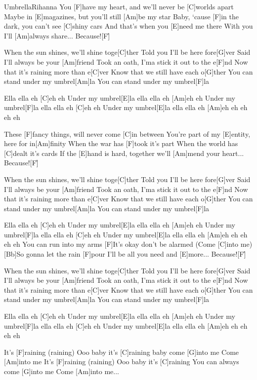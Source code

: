 \documentclass[../main.tex]{subfiles}
\begin{document}
\begin{song}[1]{Umbrella}{Rihanna}{}
You [F]have my heart, and we'll never be [C]worlds apart
Maybe in [E]magazines, but you'll still [Am]be my star
Baby, ‘cause [F]in the dark, you can't see [C]shiny cars
And that's when you [E]need me there
With you I'll [Am]always share... Because![F]{\h}

When the sun shines, we’ll shine toge[C]ther
Told you I'll be here fore[G]ver
Said I'll always be your [Am]friend
Took an oath, I'ma stick it out to the e[F]nd
Now that it's raining more than e[C]ver
Know that we still have each o[G]ther
You can stand under my umbrel[Am]la
You can stand under my umbrel[F]la

Ella ella eh [C]eh eh
Under my umbrel[E]la ella ella eh [Am]eh eh
Under my umbrel[F]la ella ella eh [C]eh eh
Under my umbrel[E]la ella ella eh [Am]eh eh eh eh eh

These [F]fancy things, will never come [C]in between
You're part of my [E]entity, here for in[Am]finity
When the war has [F]took it's part
When the world has [C]dealt it's cards
If the [E]hand is hard, together we'll [Am]mend your heart... Because![F]{\h}

When the sun shines, we’ll shine toge[C]ther
Told you I'll be here fore[G]ver
Said I'll always be your [Am]friend
Took an oath, I'ma stick it out to the e[F]nd
Now that it's raining more than e[C]ver
Know that we still have each o[G]ther
You can stand under my umbrel[Am]la
You can stand under my umbrel[F]la

Ella ella eh [C]eh eh
Under my umbrel[E]la ella ella eh [Am]eh eh
Under my umbrel[F]la ella ella eh [C]eh eh
Under my umbrel[E]la ella ella eh [Am]eh eh eh eh eh
\pagebreak
[Bb]You can run into my arms
[F]It's okay don't be alarmed (Come [C]into me)
[Bb]So gonna let the rain [F]pour
I'll be all you need and [E]more... Because![F]{\h}

When the sun shines, we’ll shine toge[C]ther
Told you I'll be here fore[G]ver
Said I'll always be your [Am]friend
Took an oath, I'ma stick it out to the e[F]nd
Now that it's raining more than e[C]ver
Know that we still have each o[G]ther
You can stand under my umbrel[Am]la
You can stand under my umbrel[F]la

Ella ella eh [C]eh eh
Under my umbrel[E]la ella ella eh [Am]eh eh
Under my umbrel[F]la ella ella eh [C]eh eh
Under my umbrel[E]la ella ella eh [Am]eh eh eh eh eh

It's [F]raining (raining)
Ooo baby it's [C]raining
baby come [G]into me
Come [Am]into me
It's [F]raining (raining)
Ooo baby it's [C]raining
You can always come [G]into me
Come [Am]into me...

\end{song}
\end{document}
